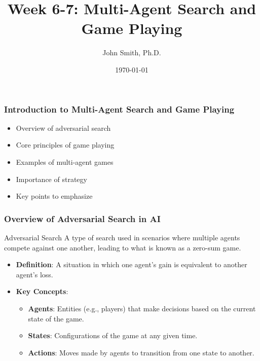 \documentclass[aspectratio=169]{beamer}
\title[Academic Template]{Week 6-7: Multi-Agent Search and Game Playing}
\author[J. Smith]{John Smith, Ph.D.}
\institute[University Name]{
  Department of Computer Science\\
  University Name\\
  \vspace{0.3cm}
  Email: email@university.edu\\
  Website: www.university.edu
}
\date{\today}
\begin{document}
\frame{\titlepage}

\begin{frame}[fragile]
    \frametitle{Introduction to Multi-Agent Search and Game Playing}
    \begin{itemize}
        \item Overview of adversarial search 
        \item Core principles of game playing 
        \item Examples of multi-agent games 
        \item Importance of strategy 
        \item Key points to emphasize 
    \end{itemize}
\end{frame}

\begin{frame}[fragile]
    \frametitle{Overview of Adversarial Search in AI}
    \begin{block}{Adversarial Search}
        A type of search used in scenarios where multiple agents compete against one another, leading to what is known as a zero-sum game.
    \end{block}
    \begin{itemize}
        \item \textbf{Definition}: A situation in which one agent's gain is equivalent to another agent's loss.
        \item \textbf{Key Concepts}:
            \begin{itemize}
                \item \textbf{Agents}: Entities (e.g., players) that make decisions based on the current state of the game.
                \item \textbf{States}: Configurations of the game at any given time.
                \item \textbf{Actions}: Moves made by agents to transition from one state to another.
            \end{itemize}
    \end{itemize}
\end{frame}
\end{document}
